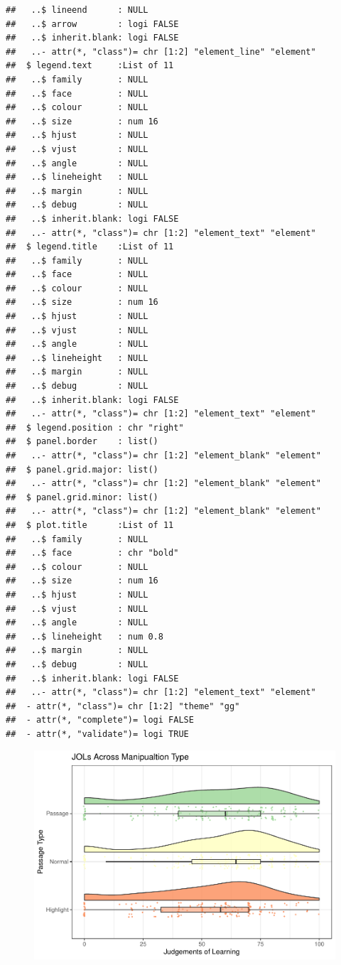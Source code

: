 \documentclass[doc]{apa6}
\begin{document}
\begin{verbatim}
##   ..$ lineend      : NULL
##   ..$ arrow        : logi FALSE
##   ..$ inherit.blank: logi FALSE
##   ..- attr(*, "class")= chr [1:2] "element_line" "element"
##  $ legend.text     :List of 11
##   ..$ family       : NULL
##   ..$ face         : NULL
##   ..$ colour       : NULL
##   ..$ size         : num 16
##   ..$ hjust        : NULL
##   ..$ vjust        : NULL
##   ..$ angle        : NULL
##   ..$ lineheight   : NULL
##   ..$ margin       : NULL
##   ..$ debug        : NULL
##   ..$ inherit.blank: logi FALSE
##   ..- attr(*, "class")= chr [1:2] "element_text" "element"
##  $ legend.title    :List of 11
##   ..$ family       : NULL
##   ..$ face         : NULL
##   ..$ colour       : NULL
##   ..$ size         : num 16
##   ..$ hjust        : NULL
##   ..$ vjust        : NULL
##   ..$ angle        : NULL
##   ..$ lineheight   : NULL
##   ..$ margin       : NULL
##   ..$ debug        : NULL
##   ..$ inherit.blank: logi FALSE
##   ..- attr(*, "class")= chr [1:2] "element_text" "element"
##  $ legend.position : chr "right"
##  $ panel.border    : list()
##   ..- attr(*, "class")= chr [1:2] "element_blank" "element"
##  $ panel.grid.major: list()
##   ..- attr(*, "class")= chr [1:2] "element_blank" "element"
##  $ panel.grid.minor: list()
##   ..- attr(*, "class")= chr [1:2] "element_blank" "element"
##  $ plot.title      :List of 11
##   ..$ family       : NULL
##   ..$ face         : chr "bold"
##   ..$ colour       : NULL
##   ..$ size         : num 16
##   ..$ hjust        : NULL
##   ..$ vjust        : NULL
##   ..$ angle        : NULL
##   ..$ lineheight   : num 0.8
##   ..$ margin       : NULL
##   ..$ debug        : NULL
##   ..$ inherit.blank: logi FALSE
##   ..- attr(*, "class")= chr [1:2] "element_text" "element"
##  - attr(*, "class")= chr [1:2] "theme" "gg"
##  - attr(*, "complete")= logi FALSE
##  - attr(*, "validate")= logi TRUE
\end{verbatim}

\begin{figure}

{\centering \includegraphics{SF_Paper_files/figure-latex/unnamed-chunk-3-1} 

}

\caption{ }\label{fig:unnamed-chunk-3}
\end{figure}
\end{document}
